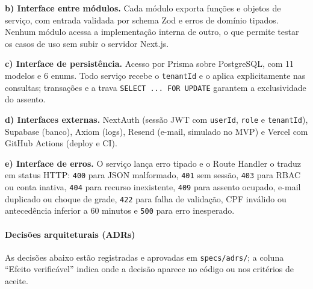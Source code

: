 \textbf{b) Interface entre módulos.} Cada módulo exporta funções e objetos de serviço, com entrada validada por schema Zod e erros de domínio tipados. Nenhum módulo acessa a implementação interna de outro, o que permite testar os casos de uso sem subir o servidor Next.js.

\textbf{c) Interface de persistência.} Acesso por Prisma sobre PostgreSQL, com 11 modelos e 6 enums. Todo serviço recebe o \texttt{tenantId} e o aplica explicitamente nas consultas; transações e a trava \texttt{SELECT \allowbreak\hspace{0pt plus 1pt}.\allowbreak\hspace{0pt plus 1pt}.\allowbreak\hspace{0pt plus 1pt}.\allowbreak\hspace{0pt plus 1pt} \allowbreak\hspace{0pt plus 1pt}FOR \allowbreak\hspace{0pt plus 1pt}UPDATE} garantem a exclusividade do assento.

\textbf{d) Interfaces externas.} NextAuth (sessão JWT com \texttt{userId}, \texttt{role} e \texttt{tenantId}), Supabase (banco), Axiom (logs), Resend (e-mail, simulado no MVP) e Vercel com GitHub Actions (deploy e CI).

\textbf{e) Interface de erros.} O serviço lança erro tipado e o Route Handler o traduz em status HTTP: \texttt{400} para JSON malformado, \texttt{401} sem sessão, \texttt{403} para RBAC ou conta inativa, \texttt{404} para recurso inexistente, \texttt{409} para assento ocupado, e-mail duplicado ou choque de grade, \texttt{422} para falha de validação, CPF inválido ou antecedência inferior a 60 minutos e \texttt{500} para erro inesperado.

\paragraph{Decisões arquiteturais (ADRs)}

As decisões abaixo estão registradas e aprovadas em \texttt{specs/\allowbreak\hspace{0pt plus 1pt}adrs/}; a coluna “Efeito verificável” indica onde a decisão aparece no código ou nos critérios de aceite.

